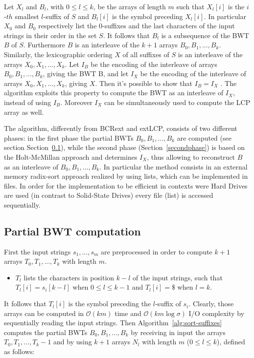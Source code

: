 \documentclass[a4paper,12pt, oneside]{article}
\begin{document}
Let $X_l$ and $B_l$, with $0 \leq l \leq k$, be the arrays of length $m$ such that $X_l[i]$ is the $i$-$th$ smallest $l$-suffix of $S$ and $B_l[i]$ is the symbol preceding $X_l[i]$. In particular $X_0$ and $B_0$ respectively list the $0$-suffixes and the last characters of the input strings in their order in the set $S$. It follows that $B_l$ is a subsequence of the BWT $B$ of $S$. Furthermore $B$ is an interleave of the $k+1$ arrays $B_0, B_1,...,B_k$. Similarly, the lexicographic ordering $X$ of all suffixes of $S$ is an interleave of the arrays $X_0, X_1, ..., X_k$. Let $I_B$ be the encoding of the interleave of arrays $B_0, B_1,...,B_k$, giving the BWT B, and let $I_X$ be the encoding of the interleave of arrays $X_0, X_1, ..., X_k$, giving $X$. Then it's possible to show that $I_B = I_X$ \cite{paper}. The algorithm exploits this property to compute the BWT as an interleave of $I_X$, instead of using $I_B$. Moreover $I_X$ can be simultaneously used to compute the LCP array as well. \par
The algorithm, differently from BCRext and extLCP, consists of two different phases: in the first phase the partial BWTs $B_0, B_1,...,B_k$ are computed (see section Section~\ref{partbwtcompute}), while the second phase (Section~\ref{secondphase}) is based on the Holt-McMillan approach \cite{interleave} and determines $I_X$, thus allowing to reconstruct $B$ as an interleave of $B_0, B_1,...,B_k$. In particular the method consists in an external memory radix-sort approach realized by using lists, which can be implemented in files. In order for the implementation to be efficient in contexts were  Hard Drives are used (in contrast to Solid-State Drives) every file (list) is accessed sequentially.


\newpage
\subsection{Partial BWT computation}
\label{partbwtcompute}

First the input strings $s_1, ..., s_m$ are preprocessed in order to compute $k+1$ arrays $T_0, T_1, ..., T_k$ with length $m$.

\begin{itemize}
	\item $T_l$ lists the characters in position $k-l$ of the input strings, such that $T_l[i] = s_i[k-l]$ when $0 \leq l \leq k-1$ and $T_l[i] = \$$ when $l = k$.
\end{itemize}

It follows that $T_l[i]$ is the symbol preceding the $l$-suffix of $s_i$. Clearly, those arrays can be computed in $\mathcal{O}(km)$ time and $\mathcal{O}(km\log \sigma)$ I/O complexity by sequentially reading the input strings.
Then Algorithm~\ref{alg:sort-suffixes} computes the partial BWTs $B_0, B_1,...,B_k$ by receiving in input the arrays $T_0, T_1,...,T_k-1$ and by using $k+1$ arrays $N_l$ with length $m$ ($0 \leq l \leq k$), defined as follows:
\end{document}
